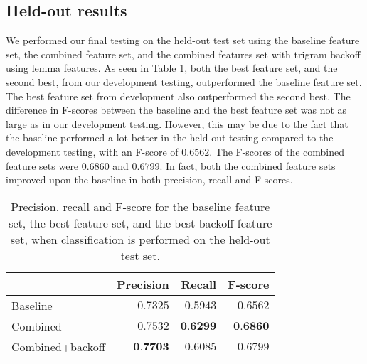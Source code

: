 \documentclass[11pt,letterpaper]{article}
\begin{document}
      


\subsection{Held-out results}
\label{sec:heldout}

We performed our final testing on the held-out test set using the baseline feature set, the combined feature set, and the combined features set with trigram backoff using lemma features. As seen in Table \ref{tab:heldout}, both the best feature set, and the second best, from our development testing, outperformed the baseline feature set. The best feature set from development also outperformed the second best. The difference in F-scores between the baseline and the best feature set was not as large as in our development testing. However, this may be due to the fact that the baseline performed a lot better in the held-out testing compared to the development testing, with an F-score of $0.6562$. The F-scores of the combined feature sets were $0.6860$ and $0.6799$. In fact, both the combined feature sets improved upon the baseline in both precision, recall and F-scores.



\begin{table}
  \begin{center}
    \begin{tabular}{lrrr}
      \toprule
      
      & Precision & Recall & F-score\\
      \midrule
      Baseline & $0.7325$ & $0.5943$ & $0.6562$ \\
      Combined & $0.7532$ & $\textbf{0.6299}$ & $\textbf{0.6860}$  \\
      Combined+backoff & $\textbf{0.7703}$ & $0.6085$ & $0.6799$ \\
      
      
      \bottomrule

    \end{tabular}
  \end{center}
  \caption{Precision, recall and F-score for the baseline feature set, the best feature set, and the best backoff feature set, when classification is performed on the held-out test set.}
  \label{tab:heldout}
\end{table}







\end{document}
